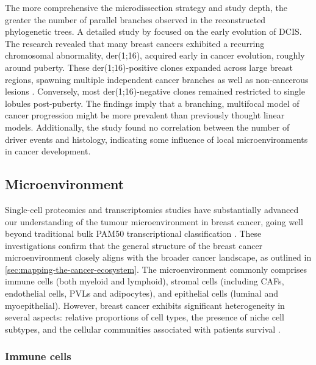 The more comprehensive the microdissection strategy and study depth, the greater the number of parallel branches observed in the reconstructed phylogenetic trees. A detailed study by \parencite{Nishimura2023-mk} focused on the early evolution of \ac{DCIS}. The research revealed that many breast cancers exhibited a recurring chromosomal abnormality, der(1;16), acquired early in cancer evolution, roughly around puberty. These der(1;16)-positive clones expanded across large breast regions, spawning multiple independent cancer branches as well as non-cancerous lesions . Conversely, most der(1;16)-negative clones remained restricted to single lobules post-puberty. The findings imply that a branching, multifocal model of cancer progression might be more prevalent than previously thought linear models. Additionally, the study found no correlation between the number of driver events and histology, indicating some influence of local microenvironments in cancer development.

\subsection{Microenvironment}

Single-cell proteomics and transcriptomics studies have substantially advanced our understanding of the tumour microenvironment in breast cancer, going well beyond traditional bulk PAM50 transcriptional classification \parencite{Wu2021-uq,Pal2021-rf,Wagner2019-zp}. These investigations confirm that the general structure of the breast cancer microenvironment closely aligns with the broader cancer landscape, as outlined in \cref{sec:mapping-the-cancer-ecosystem}. The microenvironment commonly comprises immune cells (both myeloid and lymphoid), stromal cells (including \acfp{CAF}, endothelial cells, \acfp{PVL} and adipocytes), and epithelial cells (luminal and myoepithelial). However, breast cancer exhibits significant heterogeneity in several aspects: relative proportions of cell types, the presence of niche cell subtypes, and the cellular communities associated with patients survival \parencite{Jackson2020-em, Danenberg2022-zb}.

\subsubsection*{Immune cells}

